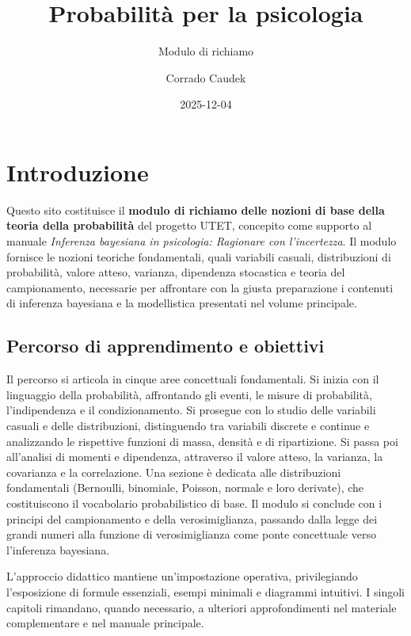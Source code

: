 \documentclass[
  letterpaper,
  DIV=11,
  numbers=noendperiod,
  oneside]{scrreprt}
\title{Probabilità per la psicologia}
\subtitle{Modulo di richiamo}
\author{Corrado Caudek}
\date{2025-12-04}
\theoremstyle{definition}
\theoremstyle{plain}
\theoremstyle{definition}
\theoremstyle{remark}
\begin{document}
\maketitle



\chapter*{Introduzione}\label{introduzione}


Questo sito costituisce il \textbf{modulo di richiamo delle nozioni di
base della teoria della probabilità} del progetto UTET, concepito come
supporto al manuale \emph{Inferenza bayesiana in psicologia: Ragionare
con l'incertezza}. Il modulo fornisce le nozioni teoriche fondamentali,
quali variabili casuali, distribuzioni di probabilità, valore atteso,
varianza, dipendenza stocastica e teoria del campionamento, necessarie
per affrontare con la giusta preparazione i contenuti di inferenza
bayesiana e la modellistica presentati nel volume principale.

\section*{Percorso di apprendimento e
obiettivi}\label{percorso-di-apprendimento-e-obiettivi}


Il percorso si articola in cinque aree concettuali fondamentali. Si
inizia con il linguaggio della probabilità, affrontando gli eventi, le
misure di probabilità, l'indipendenza e il condizionamento. Si prosegue
con lo studio delle variabili casuali e delle distribuzioni,
distinguendo tra variabili discrete e continue e analizzando le
rispettive funzioni di massa, densità e di ripartizione. Si passa poi
all'analisi di momenti e dipendenza, attraverso il valore atteso, la
varianza, la covarianza e la correlazione. Una sezione è dedicata alle
distribuzioni fondamentali (Bernoulli, binomiale, Poisson, normale e
loro derivate), che costituiscono il vocabolario probabilistico di base.
Il modulo si conclude con i principi del campionamento e della
verosimiglianza, passando dalla legge dei grandi numeri alla funzione di
verosimiglianza come ponte concettuale verso l'inferenza bayesiana.

L'approccio didattico mantiene un'impostazione operativa, privilegiando
l'esposizione di formule essenziali, esempi minimali e diagrammi
intuitivi. I singoli capitoli rimandano, quando necessario, a ulteriori
approfondimenti nel materiale complementare e nel manuale principale.
\end{document}
